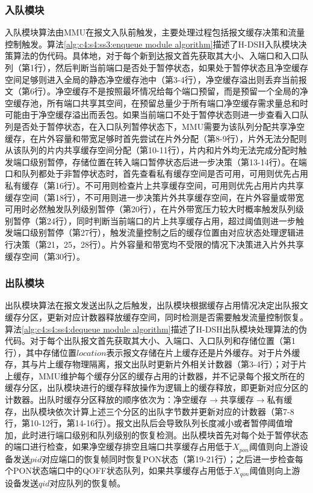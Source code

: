 \subsubsection{入队模块}
入队模块算法由MMU在报文入队前触发，主要处理过程包括报文缓存决策和流量控制触发。算法\ref{alg:c4:s4:ss3:enqueue module algorithm}描述了H-DSH入队模块决策算法的伪代码。具体地，对于每个新到达报文首先获取其大小、入端口和入口队列（第1行），然后判断当前端口是否处于暂停状态，如果处于暂停状态且净空缓存空间足够则进入全局的静态净空缓存池中（第3-4行），净空缓存溢出则丢弃当前报文（第6行）。净空缓存不是按照最坏情况给每个端口预留，而是预留一个全局的净空缓存池，所有端口共享其空间，在预留总量少于所有端口净空缓存需求量总和时可能由于净空缓存溢出而丢包。如果当前端口不处于暂停状态则进一步查看入口队列是否处于暂停状态，在入口队列暂停状态下，MMU需要为该队列分配共享净空缓存，在片外容量和带宽足够时首先尝试在片外分配（第8-9行），片外无法分配则从该队列的片内共享缓存空间分配（第10-11行），片内和片外均无法完成分配时触发端口级别暂停，存储位置在转入端口暂停状态后进一步决策（第13-14行）。在端口和队列都处于非暂停状态时，首先查看私有缓存空间是否可用，可用则优先占用私有缓存（第16行）。不可用则检查片上共享缓存空间，可用则优先占用片内共享缓存空间（第18行），不可用则进一步决策片外共享缓存空间，在片外容量或带宽可用时必然触发队列级别暂停（第20行），在片外带宽压力较大时概率触发队列级别暂停（第24行），同时判断当前端口的片上共享缓存占用，超过阈值则进一步触发端口级别暂停（第27行），触发流量控制之后的缓存位置由对应状态处理逻辑进行决策（第21，25，28行）。片外容量和带宽均不受限的情况下决策进入片外共享缓存空间（第30行）。

\subsubsection{出队模块}
出队模块算法在报文发送出队之后触发，出队模块根据缓存占用情况决定出队报文缓存分区，更新对应计数器释放缓存空间，同时检测是否需要触发流量控制恢复。算法\ref{alg:c4:s4:ss4:dequeue module algorithm}描述了H-DSH出队模块处理算法的伪代码。对于每个出队报文首先获取其大小、入端口、入口队列和存储位置（第1行），其中存储位置$location$表示报文存储在片上缓存还是片外缓存。对于片外缓存，其与片上缓存物理隔离，报文出队时更新片外相关计数器（第3-4行）；对于片上缓存，MMU维护每个缓存分区的缓存占用的计数器，并不记录每个报文所在的缓存分区，出队模块进行的缓存释放操作为逻辑上的缓存释放，即更新对应分区的计数器。出队时缓存分区释放的顺序依次为：净空缓存$\rightarrow$共享缓存$\rightarrow$私有缓存，出队模块依次计算上述三个分区的出队字节数并更新对应的计数器（第7-8行，第10-12行，第14-16行）。报文出队后会导致队列长度减小或者暂停阈值增加，此时进行端口级别和队列级别的恢复检测。出队模块首先对每个处于暂停状态的端口进行检查，如果净空缓存排空且端口共享缓存占用低于$X_{pon}$阈值则向上游设备发送$pid$对应端口的恢复帧同时恢复PON状态（第19-21行）；之后进一步检查每个PON状态端口中的QOFF状态队列，如果共享缓存占用低于$X_{qon}$阈值则向上游设备发送$qid$对应队列的恢复帧。


